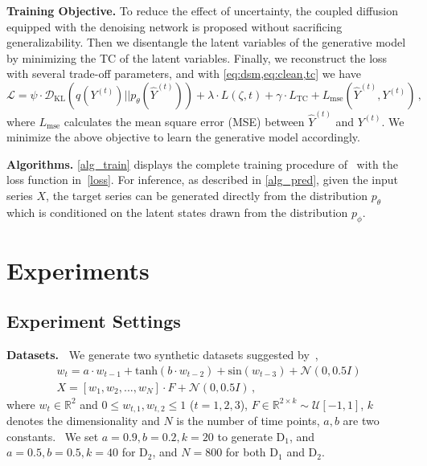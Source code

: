 \textbf{Training Objective.} 
To reduce the effect of uncertainty, the coupled diffusion equipped with the denoising network is proposed without sacrificing generalizability. 
Then we disentangle the latent variables of the generative model by minimizing the TC of the latent variables. 
Finally, we reconstruct the loss with several trade-off parameters, 
and with \cref{eq:dsm,eq:clean,tc} we have
\begin{equation}    \label{loss}
\mathcal{L} 
= 
\psi \cdot  \mathcal{D}_{\mathrm{KL}} (q(Y^{(t)})||p_\theta(\widehat{Y}^{(t)})) 
+ 
\lambda \cdot {L} (\zeta, t) 
+ 
\gamma \cdot L_{\text{TC}} 
+ 
L_{\text{mse}} (\widehat{Y}^{(t)}, Y^{(t)}) 
\, ,
\end{equation}
where $L_{\text{mse}}$ calculates the mean square error (MSE) between $\widehat{Y}^{(t)}$ and $Y^{(t)}$.
We minimize the above objective to learn the generative model accordingly. 

{\bf Algorithms.}
\cref{alg_train} displays the complete training procedure of \ourmodel~with the loss function in~\cref{loss}. 
For inference, as described in \cref{alg_pred}, given the input series $X$, the target series can be generated directly from the distribution $p_{\theta}$ which is conditioned on the latent states drawn from the distribution $p_{\phi}$. 

\section{Experiments} \label{experiment}

\subsection{Experiment Settings}  \label{setting}

\textbf{Datasets.~}%
We generate two synthetic datasets suggested by~\cite{farnoosh2020deep}, 
\begin{equation*}
\begin{gathered}
     w_t = a \cdot  w_{t-1} + \text{tanh}(b \cdot  w_{t-2}) + \text{sin}(w_{t-3}) + \mathcal{N}(0, 0.5I)\\
     X = [w_1, w_2, ..., w_N] \cdot  F + \mathcal{N}(0, 0.5I) \, ,
\end{gathered}
\end{equation*}
where $w_t \in \mathbb{R}^2$ and $ 0 \leq w_{t, 1}, w_{t, 2} \leq 1 $ ($t = 1,2,3$), 
$F \in \mathbb{R}^{2 \times k} \sim \mathcal{U}[-1, 1]$, $k$ denotes the dimensionality and $N$ is the number of time points, $a, b$ are two constants.~%
We set $a=0.9, b=0.2, k=20$ to generate D$_1$, and $a=0.5, b=0.5, k=40$ for D$_2$, and $N = 800$ for both D$_1$ and D$_2$.

